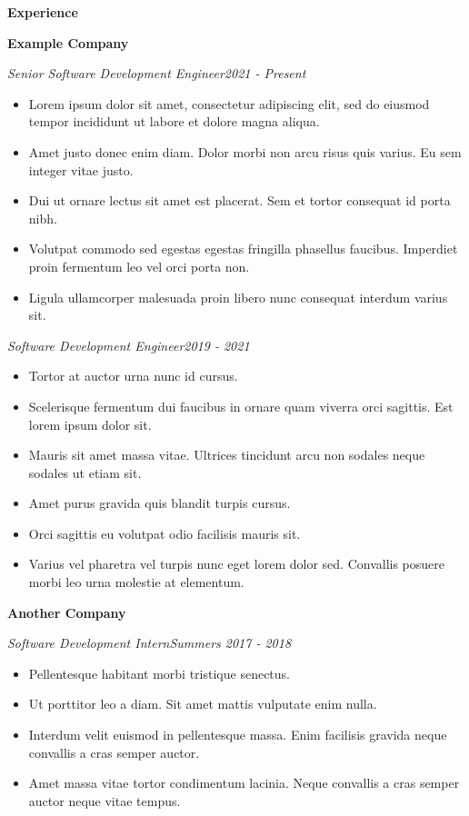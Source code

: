 \documentclass[12pt]{article}
\newcommand{\Section}[1]{
    \begingroup
    \color{blue}\Large\bfseries
    \vspace{4mm plus .5mm minus .5mm}
    #1
    \par
    \vspace{4mm plus .5mm minus .5mm}
    \endgroup
}
\newcommand{\Subsection}[1]{
    \begingroup
    \color{black}\normalsize\bfseries
    #1
    \par
    \vspace{1mm plus .25mm minus .25mm}
    \endgroup
}
\newcommand{\Subsubsection}[2]{
    \begingroup
    \color{black}\normalsize\itshape
    #1\hfill#2
    \par
    \vspace{1mm plus .25mm minus .25mm}
    \endgroup
}
\newcommand{\Content}[1]{
    #1
    \par
    \vspace{2mm plus .5mm minus .5mm}
}
\begin{document}
\begin{paracol}{2}

    \Section{Experience}
    \Subsection{Example Company}
    \Subsubsection{Senior Software Development Engineer}{2021 - Present}
    \Content{
        \begin{itemize}
            \item Lorem ipsum dolor sit amet, consectetur adipiscing elit, sed do eiusmod tempor incididunt ut labore et dolore magna aliqua.
            \item Amet justo donec enim diam. Dolor morbi non arcu risus quis varius. Eu sem integer vitae justo.
            \item Dui ut ornare lectus sit amet est placerat. Sem et tortor consequat id porta nibh.
            \item Volutpat commodo sed egestas egestas fringilla phasellus faucibus. Imperdiet proin fermentum leo vel orci porta non.
            \item Ligula ullamcorper malesuada proin libero nunc consequat interdum varius sit.
        \end{itemize}
    }
    \Subsubsection{Software Development Engineer}{2019 - 2021}
    \Content{
        \begin{itemize}
            \item Tortor at auctor urna nunc id cursus.
            \item Scelerisque fermentum dui faucibus in ornare quam viverra orci sagittis. Est lorem ipsum dolor sit.
            \item Mauris sit amet massa vitae. Ultrices tincidunt arcu non sodales neque sodales ut etiam sit.
            \item Amet purus gravida quis blandit turpis cursus.
            \item Orci sagittis eu volutpat odio facilisis mauris sit.
            \item Varius vel pharetra vel turpis nunc eget lorem dolor sed. Convallis posuere morbi leo urna molestie at elementum.
        \end{itemize}
    }
    \Subsection{Another Company}
    \Subsubsection{Software Development Intern}{Summers 2017 - 2018}
    \Content{
        \begin{itemize}
            \item Pellentesque habitant morbi tristique senectus.
            \item Ut porttitor leo a diam. Sit amet mattis vulputate enim nulla.
            \item Interdum velit euismod in pellentesque massa. Enim facilisis gravida neque convallis a cras semper auctor.
            \item Amet massa vitae tortor condimentum lacinia. Neque convallis a cras semper auctor neque vitae tempus.
        \end{itemize}
    }


\end{paracol}
\end{document}
